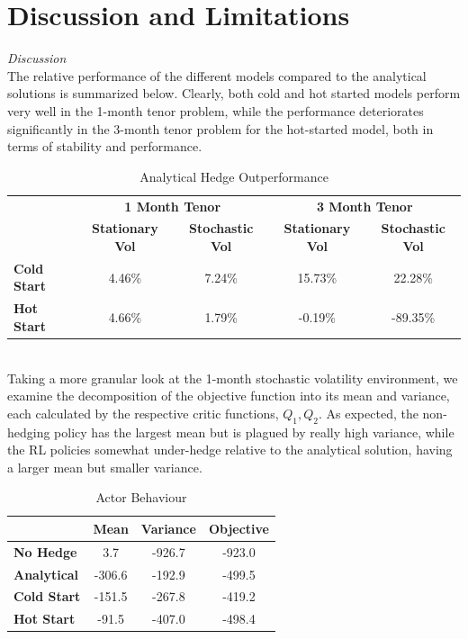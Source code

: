 \documentclass{article}
\begin{document}
\section{Discussion and Limitations}
\textit{Discussion}\\
The relative performance of the different models compared to the analytical solutions is summarized below. Clearly, both cold and hot started models perform very well in the 1-month tenor problem, while the performance deteriorates significantly in the 3-month tenor problem for the hot-started model, both in terms of stability and performance.
\begin{table}[h]
\centering
\caption{Analytical Hedge Outperformance}
\setlength{\tabcolsep}{12pt} %
\renewcommand{\arraystretch}{1.5} %
\begin{tabular}{|l|c|c|c|c|}
\hline
\textbf{} & \multicolumn{2}{c|}{\textbf{1 Month Tenor}} & \multicolumn{2}{c|}{\textbf{3 Month Tenor}} \\
\textbf{} & \textbf{Stationary Vol} & \textbf{Stochastic Vol} & \textbf{Stationary Vol} & \textbf{Stochastic Vol} \\
\hline
\textbf{Cold Start} & 4.46\% & 7.24\% & 15.73\% & 22.28\% \\
\textbf{Hot Start}  & 4.66\% & 1.79\% & -0.19\% & -89.35\% \\
\hline
\end{tabular}
\end{table}\\
Taking a more granular look at the 1-month stochastic volatility environment, we examine the decomposition of the objective function into its mean and variance, each calculated by the respective critic functions, $Q_1, Q_2$. As expected, the non-hedging policy has the largest mean but is plagued by really high variance, while the RL policies somewhat under-hedge relative to the analytical solution, having a larger mean but smaller variance. 
\begin{table}[h]
\centering
\caption{Actor Behaviour}
\setlength{\tabcolsep}{14pt} %
\renewcommand{\arraystretch}{1.5} %
\begin{tabular}{|l|c|c|c|}
\hline
\textbf{} & \textbf{Mean} & \textbf{Variance} & \textbf{Objective} \\
\hline
\textbf{No Hedge}   & 3.7     & -926.7 & -923.0 \\
\textbf{Analytical} & -306.6  & -192.9 & -499.5 \\
\textbf{Cold Start} & -151.5  & -267.8 & -419.2 \\
\textbf{Hot Start}  & -91.5   & -407.0 & -498.4 \\
\hline
\end{tabular}
\end{table}
\end{document}
